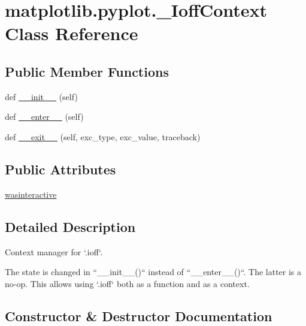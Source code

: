 \hypertarget{classmatplotlib_1_1pyplot_1_1__IoffContext}{}\section{matplotlib.\+pyplot.\+\_\+\+Ioff\+Context Class Reference}
\label{classmatplotlib_1_1pyplot_1_1__IoffContext}
\subsection*{Public Member Functions}
\begin{DoxyCompactItemize}
\item 
def \hyperlink{classmatplotlib_1_1pyplot_1_1__IoffContext_aac4fb17d04ab5e1e9b3ae52da09e73ba}{\+\_\+\+\_\+init\+\_\+\+\_\+} (self)
\item 
def \hyperlink{classmatplotlib_1_1pyplot_1_1__IoffContext_a5661c5bfe56134a2b94575d0e9cc3f95}{\+\_\+\+\_\+enter\+\_\+\+\_\+} (self)
\item 
def \hyperlink{classmatplotlib_1_1pyplot_1_1__IoffContext_abae8643f22b1024f1c8d6836231f267c}{\+\_\+\+\_\+exit\+\_\+\+\_\+} (self, exc\+\_\+type, exc\+\_\+value, traceback)
\end{DoxyCompactItemize}
\subsection*{Public Attributes}
\begin{DoxyCompactItemize}
\item 
\hyperlink{classmatplotlib_1_1pyplot_1_1__IoffContext_ae3f197e917a82fe17abd55528db3af61}{wasinteractive}
\end{DoxyCompactItemize}


\subsection{Detailed Description}
\begin{DoxyVerb}Context manager for `.ioff`.

The state is changed in ``__init__()`` instead of ``__enter__()``. The
latter is a no-op. This allows using `.ioff` both as a function and
as a context.
\end{DoxyVerb}
 

\subsection{Constructor \& Destructor Documentation}
\mbox{\label{classmatplotlib_1_1pyplot_1_1__IoffContext_aac4fb17d04ab5e1e9b3ae52da09e73ba}} 
